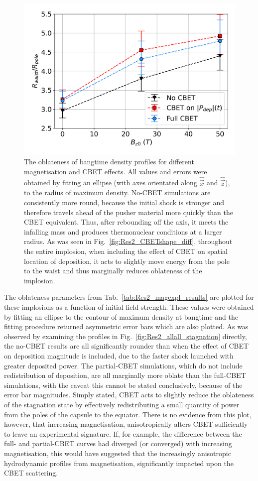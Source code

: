 \begin{figure}[t!]
    \includegraphics[width=0.6\linewidth]{Results2/Images/R2R0_errors.png}
    \centering
    \caption{The oblateness of bangtime density profiles for different magnetisation and \ac{CBET} effects.
    All values and errors were obtained by fitting an ellipse (with axes orientated along $\hat{\vec{x}}$ and $\hat{\vec{z}}$), to the radius of maximum density.
    No-\ac{CBET} simulations are consistently more round, because the initial shock is stronger and therefore travels ahead of the pusher material more quickly than the \ac{CBET} equivalent.
    Thus, after rebounding off the axis, it meets the infalling mass and produces thermonuclear conditions at a larger radius.
    As was seen in Fig.~\ref{fig:Res2_CBETshape_diff}, throughout the entire implosion, when including the effect of \ac{CBET} on spatial location of deposition, it acts to slightly move energy from the pole to the waist and thus marginally reduces oblateness of the implosion.}%
    \label{fig:Res2_R2R0_errors}
\end{figure}

The oblateness parameters from Tab.~\ref{tab:Res2_magexpl_results} are plotted for these implosions as a function of initial field strength.
These values were obtained by fitting an ellipse to the contour of maximum density at bangtime and the fitting procedure returned asymmetric error bars which are also plotted.
As was observed by examining the profiles in Fig.~\ref{fig:Res2_allall_stagnation} directly, the no-\ac{CBET} results are all significantly rounder than when the effect of \ac{CBET} on deposition magnitude is included, due to the faster shock launched with greater deposited power.
The partial-\ac{CBET} simulations, which do not include redistribution of deposition, are all marginally more oblate than the full-\ac{CBET} simulations, with the caveat this cannot be stated conclusively, because of the error bar magnitudes.
Simply stated, \ac{CBET} acts to slightly reduce the oblateness of the stagnation state by effectively redistributing a small quantity of power from the poles of the capsule to the equator.
There is no evidence from this plot, however, that increasing magnetisation, anisotropically alters \ac{CBET} sufficiently to leave an experimental signature.
If, for example, the difference between the full- and partial-\ac{CBET} curves had diverged (or converged) with increasing magnetisation, this would have suggested that the increasingly anisotropic hydrodynamic profiles from magnetisation, significantly impacted upon the \ac{CBET} scattering.

